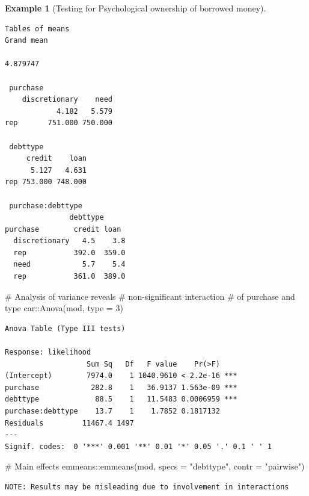 \documentclass[
  11pt,
  letterpaper,
]{scrbook}
\newenvironment{Shaded}{\begin{snugshade}}{\end{snugshade}}
\newcommand{\AttributeTok}[1]{\textcolor[rgb]{0.40,0.45,0.13}{#1}}
\newcommand{\CommentTok}[1]{\textcolor[rgb]{0.37,0.37,0.37}{#1}}
\newcommand{\DecValTok}[1]{\textcolor[rgb]{0.68,0.00,0.00}{#1}}
\newcommand{\FunctionTok}[1]{\textcolor[rgb]{0.28,0.35,0.67}{#1}}
\newcommand{\NormalTok}[1]{\textcolor[rgb]{0.00,0.23,0.31}{#1}}
\newcommand{\SpecialCharTok}[1]{\textcolor[rgb]{0.37,0.37,0.37}{#1}}
\newcommand{\StringTok}[1]{\textcolor[rgb]{0.13,0.47,0.30}{#1}}
\theoremstyle{definition}
\newtheorem{example}{Example}[chapter]
\theoremstyle{remark}
\begin{document}
\begin{example}[Testing for Psychological ownership of borrowed
money]
\begin{verbatim}
Tables of means
Grand mean
         
4.879747 

 purchase 
    discretionary    need
            4.182   5.579
rep       751.000 750.000

 debttype 
     credit    loan
      5.127   4.631
rep 753.000 748.000

 purchase:debttype 
               debttype
purchase        credit loan 
  discretionary   4.5    3.8
  rep           392.0  359.0
  need            5.7    5.4
  rep           361.0  389.0
\end{verbatim}

\begin{Shaded}
\begin{Highlighting}[]
\CommentTok{\# Analysis of variance reveals }
\CommentTok{\# non{-}significant interaction}
\CommentTok{\# of purchase and type}
\NormalTok{car}\SpecialCharTok{::}\FunctionTok{Anova}\NormalTok{(mod, }\AttributeTok{type =} \DecValTok{3}\NormalTok{)}
\end{Highlighting}
\end{Shaded}

\begin{verbatim}
Anova Table (Type III tests)

Response: likelihood
                   Sum Sq   Df   F value    Pr(>F)    
(Intercept)        7974.0    1 1040.9610 < 2.2e-16 ***
purchase            282.8    1   36.9137 1.563e-09 ***
debttype             88.5    1   11.5483 0.0006959 ***
purchase:debttype    13.7    1    1.7852 0.1817132    
Residuals         11467.4 1497                        
---
Signif. codes:  0 '***' 0.001 '**' 0.01 '*' 0.05 '.' 0.1 ' ' 1
\end{verbatim}

\begin{Shaded}
\begin{Highlighting}[]
\CommentTok{\# Main effects}
\NormalTok{emmeans}\SpecialCharTok{::}\FunctionTok{emmeans}\NormalTok{(mod, }
                 \AttributeTok{specs =} \StringTok{"debttype"}\NormalTok{,}
                 \AttributeTok{contr =} \StringTok{"pairwise"}\NormalTok{)}
\end{Highlighting}
\end{Shaded}

\begin{verbatim}
NOTE: Results may be misleading due to involvement in interactions
\end{verbatim}


\end{example}
\end{document}
